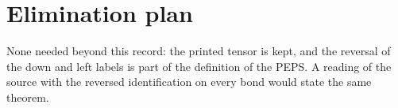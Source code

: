 \documentclass{article}
\begin{document}
\section{Elimination plan}
None needed beyond this record: the printed tensor is kept, and the reversal
of the down and left labels is part of the definition of the PEPS. A reading
of the source with the reversed identification on every bond would state the
same theorem.



\end{document}
